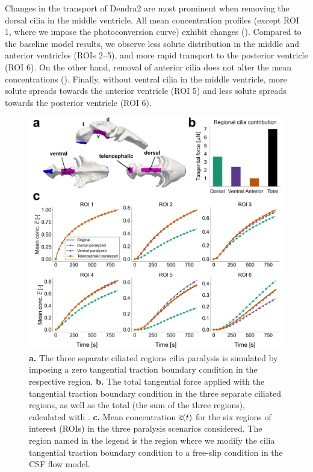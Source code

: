 \documentclass{WileyMSP-template}
\begin{document}
Changes in the transport of Dendra2 are most prominent when removing the dorsal cilia
in the middle ventricle. All mean concentration profiles 
(except ROI 1, where we impose the photoconversion curve)
exhibit changes ().
Compared to the baseline model results, we observe less solute distribution
in the middle and anterior ventricles (ROIs 2--5),
and more rapid transport to the posterior ventricle (ROI 6).
On the other hand, removal of anterior cilia does not alter the 
mean concentrations ().
Finally, without ventral cilia in the middle ventricle,
more solute spreads towards the anterior ventricle (ROI 5) and
less solute spreads towards the posterior ventricle (ROI 6).
\begin{figure}
    \centering
    \includegraphics[width=\textwidth]{graphics/figure5_compare_cilia_modifications.png}
    \caption{\textbf{a.} The three separate ciliated regions cilia paralysis is simulated
    by imposing a zero tangential traction boundary condition in the respective region.
    \textbf{b.} The total tangential force applied with the tangential traction
    boundary condition in the three separate ciliated regions, as well as the total
    (the sum of the three regions), calculated with . 
    \textbf{c.} Mean concentration $\overline{c}(t)$ for the six regions of interest (ROIs) in the three 
    paralysis scenarios considered. The region named in the legend is the region
    where we modify the cilia tangential traction boundary condition to a free-slip condition
    in the CSF flow model.}
    \label{fig:fig5}
\end{figure}
\end{document}
